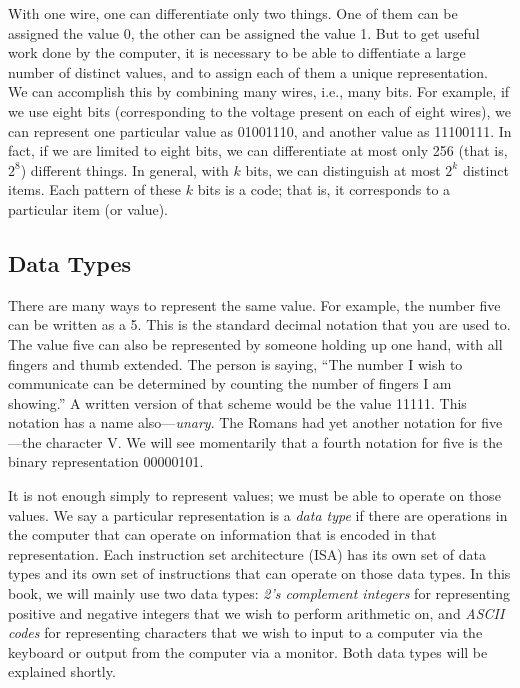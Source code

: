 \documentclass{patt}
\begin{document}
With one wire, one can differentiate only two things.  One of them can be 
assigned the value 0, the other can be assigned the value 1.  But to get 
useful work done by the computer, it is necessary to be able to diffentiate 
a large number of distinct values, and to assign each of them a unique 
representation.  We can accomplish this by combining many wires, i.e., many
bits.  \lightbulb[-18pt]
For example, if we use eight bits (corresponding to
the voltage present on each of eight wires), we can represent one particular
value as 01001110, and another value as 11100111.  In fact, if we are
limited to eight bits, we can differentiate at most only 256 (that is,
$2^8$) different things.  In general, with $k$ bits, we can
distinguish at most $2^k$ distinct items.  Each pattern of these $k$
bits is a code; that is, it corresponds to a particular
item (or value).

\subsection{Data Types}

There are many ways to represent the same value.  For example, the
number five can be written as a 5.  This is the standard decimal
notation that you are used to.  The value five can also be represented
by someone holding up one hand, with all fingers and thumb extended.
The person is saying, ``The number I wish to communicate can be
determined by counting the number of fingers I am showing.''  A
written version of that scheme would be the value 11111.  This
notation has a name also---\textit{unary}. The Romans had yet another
notation for five---the character V.  We will see momentarily that a
fourth notation for five is the binary representation 00000101.

It is not enough simply to represent values; we must be able to
operate on those values.  We say a particular representation is a {\em
  data type} if there are operations in the computer
that can operate on information that is encoded in that representation. 
Each instruction set architecture (ISA) has its own set of data types and 
its own set of instructions that can operate on those data types. In this 
book, we will mainly use two data types: {\em 2's complement integers} for
\lightbulb[-23pt]
representing positive and negative integers that we wish to perform
arithmetic on, and {\em ASCII codes} for representing characters that 
we wish to input to a computer via the keyboard or output from the computer
via a monitor.  Both data types will be explained shortly.
\end{document}
